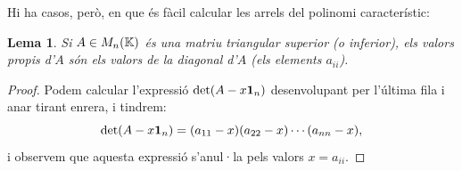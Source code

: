 \documentclass[
  11pt,
]{book}
\numberwithin{dummy}{section}
\theoremstyle{maincolornumbox}
\theoremstyle{blacknumex}
\theoremstyle{blacknumbox}
\theoremstyle{maincolornum}
\newtheorem{lemmaT}{Lema}[chapter]
\newenvironment{lemma}{\begin{pBox}\begin{lemmaT}}{\end{lemmaT}\end{pBox}}
\begin{document}
Hi ha casos, però, en que és fàcil calcular les arrels del polinomi
característic:

\begin{lemma}
\protect\hypertarget{lem:vap-triangsup}{}\label{lem:vap-triangsup}Si \(A\in M_n(\mathbb{K})\) és
una matriu triangular superior (o inferior), els valors propis d'\(A\) són
els valors de la diagonal d'\(A\) (els elements \(a_{ii}\)).
\end{lemma}

\begin{proof}
Podem calcular l'expressió \(\det(A-x\mathbf{1}_n)\) desenvolupant per
l'última fila i anar tirant enrera, i tindrem:
\[\det(A-x \mathbf{1}_n)=(a_{11}-x)(a_{22}-x)\cdots (a_{nn}-x),\] i observem que
aquesta expressió s'anul·la pels valors \(x=a_{ii}\).
\end{proof}
\end{document}
